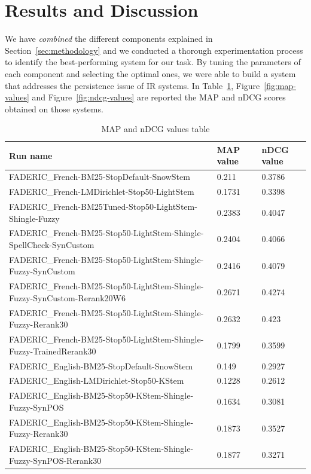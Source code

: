 \section{Results and Discussion}
\label{sec:results}

We have \emph{combined} the different components explained in Section~\ref{sec:methodology} and we conducted a thorough experimentation process to identify the best-performing system for our task. 
By tuning the parameters of each component and selecting the optimal ones, we were able to build a 
system that addresses the persistence issue of \ac{IR} systems.
In Table~\ref{tab:map-ndcg-table}, Figure~\ref{fig:map-values} 
and Figure~\ref{fig:ndcg-values} are reported the \ac{MAP} and \ac{nDCG} scores obtained on those systems.

\newpage

\begin{table}[b]
\caption{MAP and nDCG values table}
  \label{tab:map-ndcg-table}
    \centering
    \begin{tabular}{|l|l|l|}
	\toprule
        \textbf{Run name} & \textbf{MAP value} & \textbf{nDCG value} \\
	\midrule
        FADERIC\_French-BM25-StopDefault-SnowStem & 0.211 & 0.3786 \\ 
        FADERIC\_French-LMDirichlet-Stop50-LightStem & 0.1731 & 0.3398 \\ 
        FADERIC\_French-BM25Tuned-Stop50-LightStem-Shingle-Fuzzy & 0.2383 & 0.4047 \\ 
        FADERIC\_French-BM25-Stop50-LightStem-Shingle-SpellCheck-SynCustom & 0.2404 & 0.4066 \\ 
        FADERIC\_French-BM25-Stop50-LightStem-Shingle-Fuzzy-SynCustom & 0.2416 & 0.4079 \\ 
        FADERIC\_French-BM25-Stop50-LightStem-Shingle-Fuzzy-SynCustom-Rerank20W6 & 0.2671 & 0.4274 \\ 
        FADERIC\_French-BM25-Stop50-LightStem-Shingle-Fuzzy-Rerank30  & 0.2632 & 0.423 \\ 
        FADERIC\_French-BM25-Stop50-LightStem-Shingle-Fuzzy-TrainedRerank30 & 0.1799 & 0.3599 \\ 
        FADERIC\_English-BM25-StopDefault-SnowStem & 0.149 & 0.2927 \\ 
        FADERIC\_English-LMDirichlet-Stop50-KStem & 0.1228 & 0.2612 \\ 
        FADERIC\_English-BM25-Stop50-KStem-Shingle-Fuzzy-SynPOS & 0.1634 & 0.3081 \\ 
        FADERIC\_English-BM25-Stop50-KStem-Shingle-Fuzzy-Rerank30 & 0.1873 & 0.3527 \\ 
        FADERIC\_English-BM25-Stop50-KStem-Shingle-Fuzzy-SynPOS-Rerank30 & 0.1877 & 0.3271 \\
	\bottomrule
    \end{tabular}
\end{table}

